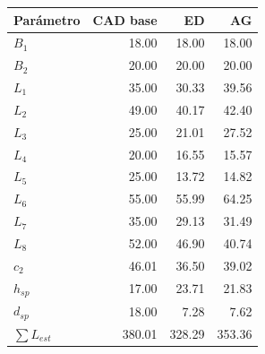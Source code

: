 \begin{tabular}{lrrr}\toprule Parámetro & CAD base & ED & AG\\\midrule
$B_1$ & 18.00 & 18.00 & 18.00\\
$B_2$ & 20.00 & 20.00 & 20.00\\
$L_1$ & 35.00 & 30.33 & 39.56\\
$L_2$ & 49.00 & 40.17 & 42.40\\
$L_3$ & 25.00 & 21.01 & 27.52\\
$L_4$ & 20.00 & 16.55 & 15.57\\
$L_5$ & 25.00 & 13.72 & 14.82\\
$L_6$ & 55.00 & 55.99 & 64.25\\
$L_7$ & 35.00 & 29.13 & 31.49\\
$L_8$ & 52.00 & 46.90 & 40.74\\
$c_2$ & 46.01 & 36.50 & 39.02\\
$h_{sp}$ & 17.00 & 23.71 & 21.83\\
$d_{sp}$ & 18.00 & 7.28 & 7.62\\
\midrule $\sum L_{est}$ & 380.01 & 328.29 & 353.36\\\bottomrule\end{tabular}
